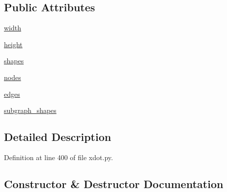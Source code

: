 \subsection*{Public Attributes}
\begin{DoxyCompactItemize}
\item 
\hyperlink{classsmacc__viewer_1_1xdot_1_1xdot_1_1Graph_a85c4c590b6e678fa36f5765a7a55f070}{width}
\item 
\hyperlink{classsmacc__viewer_1_1xdot_1_1xdot_1_1Graph_a6cb6db75d4f5a5696f69f34c6b500f34}{height}
\item 
\hyperlink{classsmacc__viewer_1_1xdot_1_1xdot_1_1Graph_a6f354c47ee7839b3a7609e42c66165c5}{shapes}
\item 
\hyperlink{classsmacc__viewer_1_1xdot_1_1xdot_1_1Graph_afcc48b27e46e8e0ddd98a35d5de99d16}{nodes}
\item 
\hyperlink{classsmacc__viewer_1_1xdot_1_1xdot_1_1Graph_af2a8b69040a55cf35b72d94790d1f323}{edges}
\item 
\hyperlink{classsmacc__viewer_1_1xdot_1_1xdot_1_1Graph_adad612ffb824b1f04e480ac8b97f5e2f}{subgraph\+\_\+shapes}
\end{DoxyCompactItemize}


\subsection{Detailed Description}


Definition at line 400 of file xdot.\+py.



\subsection{Constructor \& Destructor Documentation}
